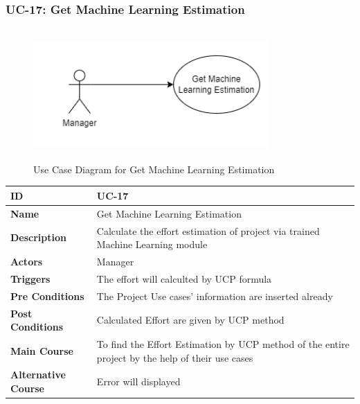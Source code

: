     \newpage

    \subsubsection{UC-17: Get Machine Learning Estimation}
    \begin{figure}[H]
        \includegraphics[height=5cm, width=0.8\textwidth]{./diagrams/Use Case/u17.png}
        \centering 
        \caption{Use Case Diagram for Get Machine Learning Estimation}
        \label{fig:Usecase1}
        \end{figure}
        
    \begin{center}
        \begin{tabularx}{\textwidth}{|l|X|}
            \hline
            \textbf{ID} & UC-17 \\
            \hline
            \textbf{Name} & Get Machine Learning Estimation \\
            \hline
            \textbf{Description} & Calculate the effort estimation of project via trained Machine Learning module \\
            \hline
            \textbf{Actors} & Manager  \\
            \hline
            \textbf{Triggers} & The effort will calculted by UCP formula \\
            \hline
            \textbf{Pre Conditions} & The Project Use cases' information are inserted already \\
            \hline
            \textbf{Post Conditions} & Calculated Effort are given by UCP method  \\
            \hline
            \textbf{Main Course} & To find the Effort Estimation by UCP method of the entire project by the help of their use cases \\
            \hline
            \textbf{Alternative Course} & Error will displayed \\
            \hline
            
        \end{tabularx}
    \end{center}
    \newpage
    

